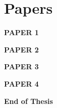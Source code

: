 \backmatter

\chapter{Papers}
\newpage

\begin{center}
\textbf{\fontsize{70}{1} \selectfont PAPER 1}
\end{center}




\begin{center}
\textbf{\fontsize{70}{1} \selectfont PAPER 2}
\end{center}



\begin{center}
\textbf{\fontsize{70}{1} \selectfont PAPER 3}
\end{center}



\begin{center}
\textbf{\fontsize{70}{1} \selectfont PAPER 4}
\end{center}



\begin{center}
\textbf{\fontsize{70}{1} \selectfont End of Thesis}
\end{center}

%
